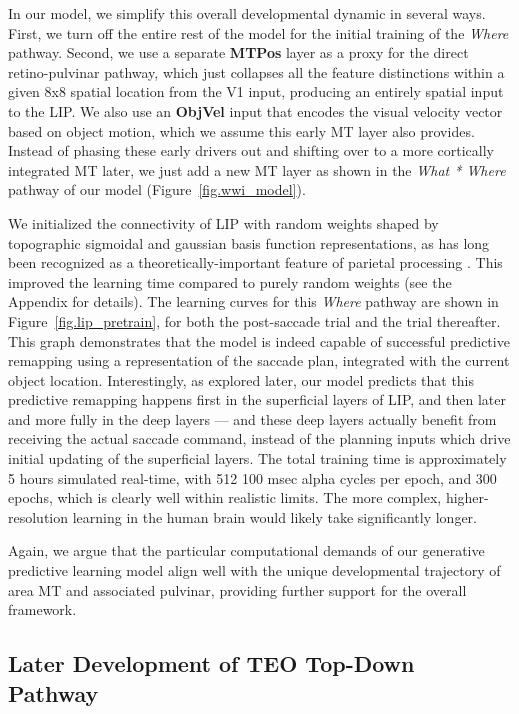 \documentclass[11pt,twoside]{article}
\newif\myifpdf
\begin{document}
In our model, we simplify this overall developmental dynamic in several ways.  First, we turn off the entire rest of the model for the initial training of the {\em Where} pathway.  Second, we use a separate {\bf MTPos} layer as a proxy for the direct retino-pulvinar pathway, which just collapses all the feature distinctions within a given 8x8 spatial location from the V1 input, producing an entirely spatial input to the LIP.  We also use an {\bf ObjVel} input that encodes the visual velocity vector based on object motion, which we assume this early MT layer also provides.  Instead of phasing these early drivers out and shifting over to a more cortically integrated MT later, we just add a new MT layer as shown in the {\em What * Where} pathway of our model (Figure~\ref{fig.wwi_model}).

We initialized the connectivity of LIP with random weights shaped by topographic sigmoidal and gaussian basis function representations, as has long been recognized as a theoretically-important feature of parietal processing \cite{ZipserAndersen88,PougetSejnowski97}.  This improved the learning time compared to purely random weights (see the Appendix for details).  The learning curves for this {\em Where} pathway are shown in Figure~\ref{fig.lip_pretrain}, for both the post-saccade trial and the trial thereafter.  This graph demonstrates that the model is indeed capable of successful predictive remapping using a representation of the saccade plan, integrated with the current object location.  Interestingly, as explored later, our model predicts that this predictive remapping happens first in the superficial layers of LIP, and then later and more fully in the deep layers --- and these deep layers actually benefit from receiving the actual saccade command, instead of the planning inputs which drive initial updating of the superficial layers.  The total training time is approximately 5 hours simulated real-time, with 512 100 msec alpha cycles per epoch, and 300 epochs, which is clearly well within realistic limits.  The more complex, higher-resolution learning in the human brain would likely take significantly longer.

Again, we argue that the particular computational demands of our generative predictive learning model align well with the unique developmental trajectory of area MT and associated pulvinar, providing further support for the overall framework.

\subsection{Later Development of TEO Top-Down Pathway}
\end{document}
